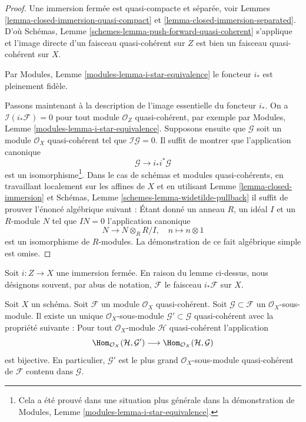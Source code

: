 \begin{proof}
Une immersion fermée est quasi-compacte et
séparée, voir Lemmes \ref{lemma-closed-immersion-quasi-compact} et \ref{lemma-closed-immersion-separated}.
D'où Schémas, Lemme \ref{schemes-lemma-push-forward-quasi-coherent}
s'applique et l'image directe d'un faisceau quasi-cohérent
sur $Z$ est bien un
faisceau quasi-cohérent sur $X$.

\medskip\noindent
Par Modules, Lemme \ref{modules-lemma-i-star-equivalence} le foncteur $i_*$
est pleinement fidèle.

\medskip\noindent
Passons maintenant à la description de l'image essentielle
du foncteur $i_*$. On a $\mathcal{I}(i_*\mathcal{F}) = 0$
pour tout module $\mathcal{O}_Z$ quasi-cohérent, par exemple
par Modules, Lemme \ref{modules-lemma-i-star-equivalence}. Supposons
ensuite que $\mathcal{G}$ soit
un module $\mathcal{O}_X$ quasi-cohérent tel que
$\mathcal{I}\mathcal{G} = 0$. Il suffit de montrer que l'application canonique
$$
\mathcal{G} \longrightarrow i_* i^*\mathcal{G}
$$
est un isomorphisme\footnote{Cela a été prouvé dans une situation
plus générale dans la démonstration de Modules, Lemme \ref{modules-lemma-i-star-equivalence}.}. Dans
le cas de schémas et modules quasi-cohérents, en travaillant localement sur
les affines de $X$ et en utilisant Lemme \ref{lemma-closed-immersion}
et Schémas, Lemme \ref{schemes-lemma-widetilde-pullback} il suffit de prouver l'énoncé
algébrique suivant : Étant donné un anneau $R$, un idéal $I$
et un $R$-module $N$ tel que $IN = 0$ l'application canonique
$$
N \longrightarrow N \otimes_R R/I,\quad
n \longmapsto n \otimes 1
$$
est un isomorphisme de $R$-modules. La démonstration de ce fait algébrique simple est omise.
\end{proof}

\noindent
Soit $i : Z \to X$ une immersion fermée. En raison du lemme ci-dessus, nous désignons
souvent, par abus de notation, $\mathcal{F}$ le faisceau $i_*\mathcal{F}$ sur $X$.

\begin{lemma}
\label{lemma-largest-quasi-coherent-subsheaf}
Soit $X$ un schéma. Soit $\mathcal{F}$ un module
$\mathcal{O}_X$ quasi-cohérent. Soit $\mathcal{G} \subset \mathcal{F}$ un $\mathcal{O}_X$-sous-module.
Il existe un unique $\mathcal{O}_X$-sous-module
$\mathcal{G}' \subset \mathcal{G}$ quasi-cohérent avec la propriété
suivante : Pour tout $\mathcal{O}_X$-module $\mathcal{H}$ quasi-cohérent
l'application
$$
\Hom_{\mathcal{O}_X}(\mathcal{H}, \mathcal{G}')
\longrightarrow
\Hom_{\mathcal{O}_X}(\mathcal{H}, \mathcal{G})
$$
est bijective. En particulier, $\mathcal{G}'$ est le plus grand $\mathcal{O}_X$-sous-module
quasi-cohérent de $\mathcal{F}$ contenu dans $\mathcal{G}$.
\end{lemma}

